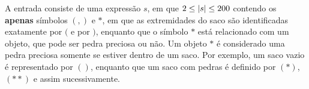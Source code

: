 A entrada consiste de uma expressão $s$, em que $2 \leq \arrowvert s \arrowvert \leq 200$ contendo os \textbf{apenas} símbolos $(,)$ e $*$, em que as extremidades do saco são identificadas exatamente por $($ e por $)$, enquanto que o símbolo $*$ está relacionado com um objeto, que pode ser pedra preciosa ou não. Um objeto $*$ é considerado uma pedra preciosa somente se estiver dentro de um saco. Por exemplo, um saco vazio é representado por $()$, enquanto que um saco com pedras é definido por $(*)$, $(**)$ e assim sucessivamente.
